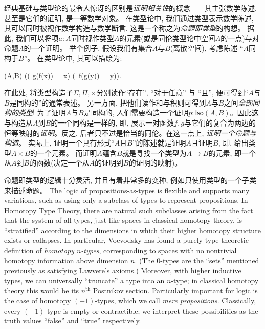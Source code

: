 经典基础与类型论的最令人惊讶的区别是\emph{证明相关性}的概念——其主张数学陈述, 甚至是它们的证明, 是一等数学对象。
在类型论中, 我们通过类型表示数学陈述, 其可以同时被视作数学构造与数学断言, 这是一个称之为\emph{命题即类型}的构想。
%
据此, 我们可以将项$a : A$同时视作类型$A$的元素(或是同伦类型论中空间$A$的一点)与对命题$A$的一个证明。
举个例子, 假设我们有集合$A$与$B$(离散空间), 
%
考虑陈述 ``$A$同构于$B$''。
在类型论中, 其可以描绘为:
\begin{narrowmultline*}
  (A,B)  \narrowbreak
  \Big(\big( g(f(x)) = x\big) \times \big(\, f(g(y)) = y\big)\Big).
\end{narrowmultline*}
%
在此处, 将类型构造子$\Sigma, \Pi, \times$分别读作``存在'', ``对于任意'' 与 ``且'', 便可得到``$A$与$B$是同构的''的通常表述。
另一方面, 把他们读作和与积则可得到$A$与$B$之间\emph{全部同构的类型}! 为了证明$A$与$B$是同构的, 人们需要构造一个证明$p : \mathsf{Iso}(A,B)$。因此这与构造从$A$到$B$的一个同构是一样的, 即,
展示一对函数$f,g$与它们的复合为两边的恒等映射的\emph{证明}。反之, 后者只不过是恰当的同伦。在这一点上, \emph{证明一个命题与构造}。
实际上, 证明一个具有形式``$A$且$B$''的陈述就是证明$A$且证明$B$, 即, 给出类型$A \times B$的一个元素。
而证明$A$蕴含$B$就是寻找一个类型为$A \to B$的元素, 即一个从$A$到$B$的函数(决定一个从$A$的证明到$B$的证明的映射)。

命题即类型的逻辑十分灵活, 并且有着非常多的变种, 例如只使用类型的一个子类来描述命题。
The logic of propositions-as-types is flexible and supports many variations, such as using only a subclass of types to represent propositions.
In Homotopy Type Theory, there are natural such subclasses arising from the fact that the system of all types, just like spaces in classical homotopy theory,
is ``stratified'' according to the dimensions in which their higher homotopy structure exists or collapses.
In particular, Voevodsky has found a purely type-theoretic definition of \emph{homotopy $n$-types}, corresponding to spaces with no nontrivial homotopy information above dimension $n$.
(The $0$-types are the ``sets'' mentioned previously as satisfying Lawvere's axioms.)
Moreover, with higher inductive types, we can universally ``truncate'' a type into an $n$-type; in classical homotopy theory this would be its $n^{\mathrm{th}}$ Postnikov section.
Particularly important for logic is the case of homotopy $(-1)$-types, which we call \emph{mere propositions}.
Classically, every $(-1)$-type is empty or contractible; we interpret these possibilities as the truth values ``false'' and ``true'' respectively.

